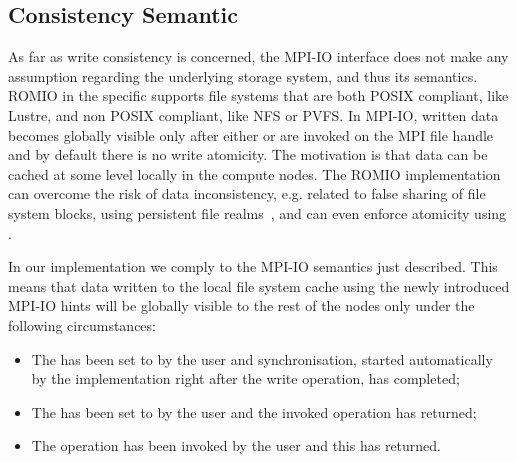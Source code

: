 \subsection{Consistency Semantic}
\label{subsec: consistency}
As far as write consistency is concerned, the MPI-IO interface does not make any assumption regarding the underlying storage system, and thus its semantics. ROMIO in the specific supports file systems that are both POSIX compliant, like Lustre, and non POSIX compliant, like NFS or PVFS. In MPI-IO, written data becomes globally visible only after either  or  are invoked on the MPI file handle and by default there is no write atomicity. The motivation is that data can be cached at some level locally in the compute nodes. The ROMIO implementation can overcome the risk of data inconsistency, e.g. related to false sharing of file system blocks, using persistent file realms~\cite{ColomaCWWRP04}, and can even enforce atomicity using .

In our implementation we comply to the MPI-IO semantics just described. This means that data written to the local file system cache using the newly introduced MPI-IO hints will be globally visible to the rest of the nodes only under the following circumstances:
\begin{itemize}
        \item The  has been set to  by the user and synchronisation, started automatically by the implementation right after the write operation, has completed;
        \item The  has been set to  by the user and the invoked  operation has returned;
 \item The  operation has been invoked by the user and this has returned.
\end{itemize}


